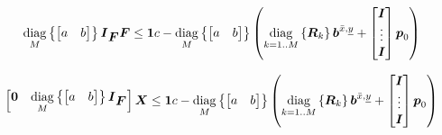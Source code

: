 \begin{equation*}
    \diag{M}{\begin{bmatrix} a & b \end{bmatrix}}
    \M{I}_{\FD}
    \FD
    \le
    \M{1} c 
    -
    \diag{M}{\begin{bmatrix} a & b \end{bmatrix}}
    \left(
        \diag{k = 1..M}{\M{R}_k}
        \V{b}^{\bar{x},\underline{y}}
        +
        \begin{bmatrix}
            \M{I} \\
            \vdots \\
            \M{I}\\
        \end{bmatrix} 
        \fp_0
    \right)
\end{equation*}


\begin{equation*}
    \begin{bmatrix}
        \M{0} & \diag{M}{\begin{bmatrix} a & b \end{bmatrix}} \M{I}_{\FD}
    \end{bmatrix}
    \M{X}
    \le
    \M{1} c 
    -
    \diag{M}{\begin{bmatrix} a & b \end{bmatrix}}
    \left(
        \diag{k = 1..M}{\M{R}_k}
        \V{b}^{\bar{x},\underline{y}}
        +
        \begin{bmatrix}
            \M{I} \\
            \vdots \\
            \M{I}\\
        \end{bmatrix} 
        \fp_0
    \right)
\end{equation*}
